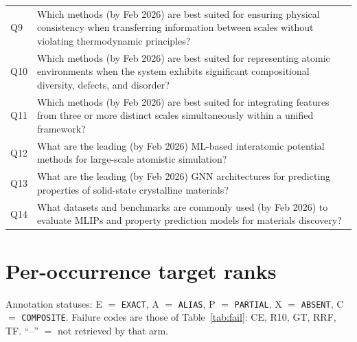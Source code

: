 \documentclass[11pt,a4paper]{article}
\begin{document}
\begin{longtable}{p{0.8cm}p{14.2cm}}
Q9 & Which methods (by Feb 2026) are best suited for ensuring physical consistency when transferring information between scales without violating thermodynamic principles? \\
Q10 & Which methods (by Feb 2026) are best suited for representing atomic environments when the system exhibits significant compositional diversity, defects, and disorder? \\
Q11 & Which methods (by Feb 2026) are best suited for integrating features from three or more distinct scales simultaneously within a unified framework? \\
Q12 & What are the leading (by Feb 2026) ML-based interatomic potential methods for large-scale atomistic simulation? \\
Q13 & What are the leading (by Feb 2026) GNN architectures for predicting properties of solid-state crystalline materials? \\
Q14 & What datasets and benchmarks are commonly used (by Feb 2026) to evaluate MLIPs and property prediction models for materials discovery? \\
\end{longtable}

\section{Per-occurrence target ranks}
\label{app:ranks}

Annotation statuses: E $=$ \texttt{EXACT}, A $=$ \texttt{ALIAS}, P $=$ \texttt{PARTIAL},
X $=$ \texttt{ABSENT}, C $=$ \texttt{COMPOSITE}. Failure codes are those of Table~\ref{tab:fail}:
CE, R10, GT, RRF, TF. ``--'' $=$ not retrieved by that arm.
\end{document}
